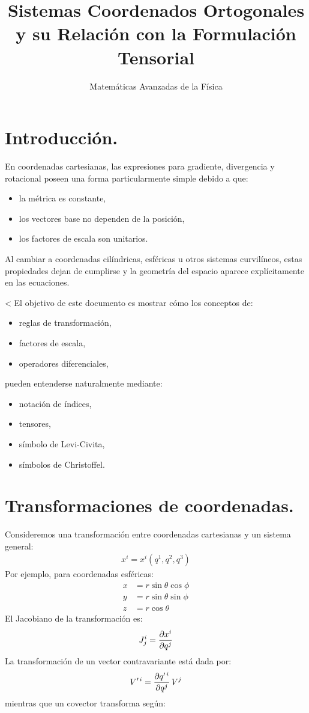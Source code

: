 \documentclass[12pt]{article}
\title{Sistemas Coordenados Ortogonales y su Relación con la Formulación Tensorial}
\author{Matemáticas Avanzadas de la Física}
\date{}
\begin{document}
\fontsize{14}{14}\selectfont
\maketitle

\section{Introducción.}

En coordenadas cartesianas, las expresiones para gradiente, divergencia y rotacional poseen una forma particularmente simple debido a que:
\begin{itemize}
    \item la métrica es constante,
    \item los vectores base no dependen de la posición,
    \item los factores de escala son unitarios.
\end{itemize}
Al cambiar a coordenadas cilíndricas, esféricas u otros sistemas curvilíneos, estas propiedades dejan de cumplirse y la geometría del espacio aparece explícitamente en las ecuaciones.
\par<
El objetivo de este documento es mostrar cómo los conceptos de:
\begin{itemize}
    \item reglas de transformación,
    \item factores de escala,
    \item operadores diferenciales,
\end{itemize}
pueden entenderse naturalmente mediante:
\begin{itemize}
    \item notación de índices,
    \item tensores,
    \item símbolo de Levi-Civita,
    \item símbolos de Christoffel.
\end{itemize}

\section{Transformaciones de coordenadas.}

Consideremos una transformación entre coordenadas cartesianas y un sistema general:
\begin{align*}
    x^{i} = x^{i} \left( q^{1}, q^{2}, q^{3} \right)
\end{align*}
Por ejemplo, para coordenadas esféricas:
\begin{align*}
x &= r \sin \theta \cos \phi \\
y &= r \sin \theta \sin \phi \\
z &= r \cos \theta
\end{align*}
El Jacobiano de la transformación es:
\begin{align*}
    J^{i}_{j} = \pdv{x^{i}}{q^{j}}
\end{align*}
La transformación de un vector contravariante está dada por:
\begin{align*}
    V^{\prime \, {i}} = \pdv{q^{\prime \, i}}{q^{j}} \, V^{j}
\end{align*}
mientras que un covector transforma según:
\end{document}
